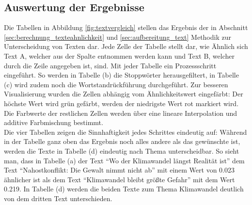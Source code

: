 \subsection{Auswertung der Ergebnisse}
Die Tabellen in Abbildung \ref{fig:textvergleich} stellen das Ergebnis der in Abschnitt \ref{sec:berechnung_texteahnlichkeit} und \ref{sec:aufbereitung_text} Methodik zur Unterscheidung von Texten dar. Jede Zelle der Tabelle stellt dar, wie Ähnlich sich Text A, welcher aus der Spalte entnommen werden kann und Text B, welcher durch die Zeile angegeben ist, sind. Mit jeder Tabelle ein Prozessschritt eingeführt. So werden in Tabelle (b) die Stoppwörter herausgefiltert, in Tabelle (c) wird zudem noch die Wortstandrückführung durchgeführt. Zur besseren Visualisierung wurden die Zellen abhängig vom Ähnlichkeitswert eingefärbt: Der höchste Wert wird grün gefärbt, werden der niedrigste Wert rot markiert wird. Die Farbwerte der restlichen Zellen werden über eine lineare Interpolation und additive Farbmischung bestimmt.\\ \newline
Die vier Tabellen zeigen die Sinnhaftigkeit jedes Schrittes eindeutig auf: Während in der Tabelle ganz oben das Ergebnis noch alles andere als das gewünschte ist, werden die Texte in Tabelle (d) eindeutig nach Thema unterscheidbar. So sieht man, dass  in Tabelle (a)  der Text "`Wo der Klimawandel längst Realität ist"' dem Text "`Nahostkonflikt: Die Gewalt nimmt nicht ab"' mit einem Wert von 0.023 ähnlicher ist als dem Text "`Klimawandel bleibt größte Gefahr"' mit dem Wert 0.219. In Tabelle (d) werden die beiden Texte zum Thema Klimawandel deutlich von dem dritten Text unterschieden. 
